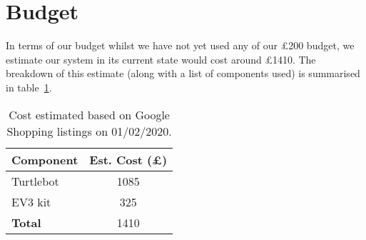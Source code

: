 \documentclass{article}
\begin{document}
\section{Budget}
In terms of our budget whilst we have not yet used any of our £200 budget, we estimate our system in its current state would cost around £1410. The breakdown of this estimate (along with a list of components used) is summarised in table~\ref{tab:budget}.

\begin{table}[h]
\vskip 3mm
\begin{center}
\begin{sc}
\begin{tabular}{lc}
\hline
\abovespace\belowspace
Component & Est. Cost (£) \\
\hline
  Turtlebot & 1085 \\
  EV3 kit & 325 \\ \hline
  {\bf Total} & 1410
\end{tabular}
\end{sc}
\caption{Cost estimated based on Google Shopping listings on 01/02/2020.}
\label{tab:budget}
\end{center}
\vskip -3mm
\end{table}



\end{document}
